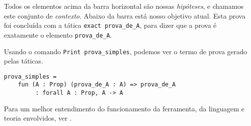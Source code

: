Todos os elementos acima da barra horizontal são nossas \emph{hipóteses}, e
chamamos este conjunto de \emph{contexto}. Abaixo da barra está nosso objetivo
atual. Esta prova foi concluída com a tática \texttt{exact prova\_de\_A}, para
dizer que a prova é exatamente o elemento \texttt{prova\_de\_A}. 

Usando o comando \texttt{Print prova\_simples}, podemos ver o termo de prova
gerado pelas táticas.

\begin{lstlisting}[basicstyle=\small]
prova_simples = 
    fun (A : Prop) (prova_de_A : A) => prova_de_A
         : forall A : Prop, A -> A

\end{lstlisting}

Para um melhor entendimento do funcionamento da ferramenta, da linguagem e
teoria envolvidos, ver \cite{pierce}.

